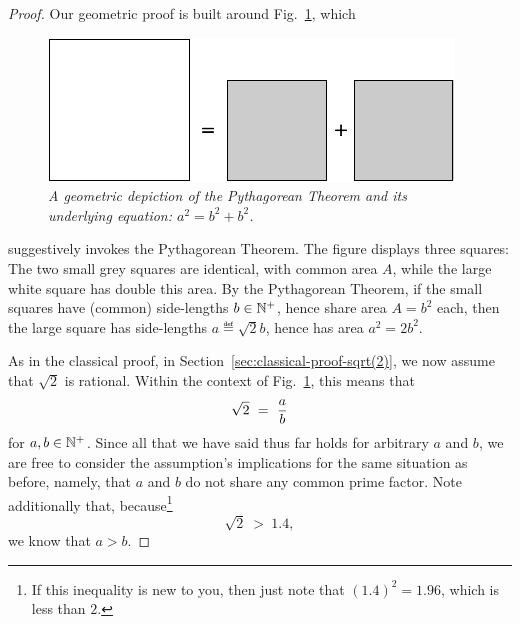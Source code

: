 \begin{proof}
Our geometric proof is built around Fig.~\ref{fig:irrationality1},
which
\begin{figure}[htb]
\begin{center}
       \includegraphics[scale=0.4]{FiguresArithmetic/sqrt2initial}
\caption{{\it A geometric depiction of the Pythagorean Theorem and its
    underlying equation: $a^2 = b^2 + b^2$.}
\label{fig:irrationality1}}
\end{center}
\end{figure}
suggestively invokes the Pythagorean Theorem.  The figure displays
three squares: The two small grey squares are identical, with common
area $A$, while the large white square has double this area.  By the
Pythagorean Theorem, if the small squares have (common) side-lengths
$b \in \mathbb{N}^+$, hence share area $A = b^2$ each, then the large square
has side-lengths $a \eqdef \sqrt{2}b$, hence has area $a^2 = 2 b^2$.

As in the classical proof, in
Section~\ref{sec:classical-proof-sqrt(2)}, we now assume that
$\sqrt{2}$ is rational.  Within the context of
Fig.~\ref{fig:irrationality1}, this means that
\[ \sqrt{2} \ = \ {a \over b} \]
for $a, b \in \mathbb{N}^+$.  Since all that we have said thus far holds for
arbitrary $a$ and $b$, we are free to consider the assumption's
implications for the same situation as before,
namely, that $a$ and $b$ do
not share any common prime factor.  Note additionally that,
because\footnote{If this inequality is new to you, then just note that
  $(1.4)^2 = 1.96$, which is less than $2$.}
\[ \sqrt{2} \ > \ 1.4, \]
we know that $a > b$.
\medskip

\noindent {}
\medskip


\end{proof}

